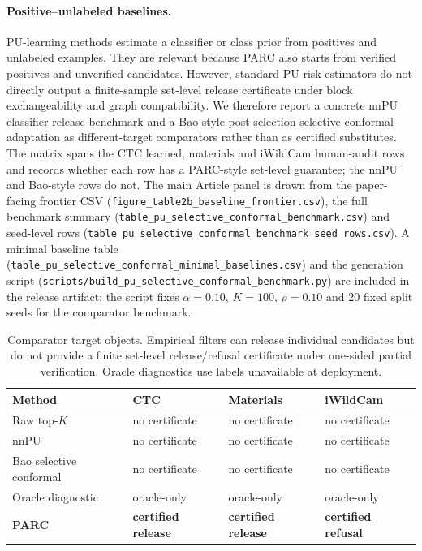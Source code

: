 \documentclass[11pt]{article}
\begin{document}
\paragraph{Positive--unlabeled baselines.}
PU-learning methods estimate a classifier or class prior from positives and unlabeled examples.
They are relevant because PARC also starts from verified positives and unverified candidates.
However, standard PU risk estimators do not directly output a finite-sample set-level release certificate under block exchangeability and graph compatibility.
We therefore report a concrete nnPU classifier-release benchmark and a Bao-style post-selection selective-conformal adaptation as different-target comparators rather than as certified substitutes.
The matrix spans the CTC learned, materials and iWildCam human-audit rows and records whether each row has a PARC-style set-level guarantee; the nnPU and Bao-style rows do not.
The main Article panel is drawn from the paper-facing frontier CSV (\texttt{figure\_table2b\_baseline\_frontier.csv}), the full benchmark summary (\texttt{table\_pu\_selective\_conformal\_benchmark.csv}) and seed-level rows (\texttt{table\_pu\_selective\_conformal\_benchmark\_seed\_rows.csv}).
A minimal baseline table (\texttt{table\_pu\_selective\_conformal\_minimal\_baselines.csv}) and the generation script (\texttt{scripts/build\_pu\_selective\_conformal\_benchmark.py}) are included in the release artifact; the script fixes \(\alpha=0.10\), \(K=100\), \(\rho=0.10\) and 20 fixed split seeds for the comparator benchmark.

\begin{table}[h]
\centering
\caption{Comparator target objects. Empirical filters can release individual candidates but do not provide a finite set-level release/refusal certificate under one-sided partial verification. Oracle diagnostics use labels unavailable at deployment.}
\small
\begin{tabular}{llll}
\toprule
Method & CTC & Materials & iWildCam \\
\midrule
Raw top-\(K\) & no certificate & no certificate & no certificate \\
nnPU & no certificate & no certificate & no certificate \\
Bao selective conformal & no certificate & no certificate & no certificate \\
Oracle diagnostic & oracle-only & oracle-only & oracle-only \\
\textbf{PARC} & \textbf{certified release} & \textbf{certified release} & \textbf{certified refusal} \\
\bottomrule
\end{tabular}
\end{table}
\end{document}
